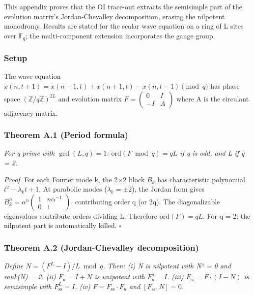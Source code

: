 \documentclass[
  11pt,
]{article}
\begin{document}
This appendix proves that the OI trace-out extracts the semisimple part
of the evolution matrix's Jordan-Chevalley decomposition, erasing the
nilpotent monodromy. Results are stated for the scalar wave equation on
a ring of L sites over \(\mathbb{F}_q\); the multi-component extension
incorporates the gauge group.

\hypertarget{setup}{%
\subsubsection{Setup}\label{setup}}

The wave equation
\(x(n, t+1) = x(n-1, t) + x(n+1, t) - x(n, t-1) \pmod{q}\) has phase
space \((\mathbb{Z}/q\mathbb{Z})^{2L}\) and evolution matrix
\(F = \left(\begin{smallmatrix} 0 & I \\ -I & A \end{smallmatrix}\right)\)
where A is the circulant adjacency matrix.

\hypertarget{theorem-a.1-period-formula}{%
\subsubsection{Theorem A.1 (Period
formula)}\label{theorem-a.1-period-formula}}

\emph{For q prime with \(\gcd(L, q) = 1\):
\(\mathrm{ord}(F \bmod q) = qL\) if q is odd, and L if q = 2.}

\emph{Proof.} For each Fourier mode k, the 2×2 block \(B_k\) has
characteristic polynomial \(t^2 - \lambda_k t + 1\). At parabolic modes
(\(\lambda_k = \pm 2\)), the Jordan form gives
\(B_k^n = \alpha^n \left(\begin{smallmatrix} 1 & n\alpha^{-1} \\ 0 & 1 \end{smallmatrix}\right)\),
contributing order q (or 2q). The diagonalizable eigenvalues contribute
orders dividing L. Therefore \(\mathrm{ord}(F) = qL\). For q = 2: the
nilpotent part is automatically killed. \(\square\)

\hypertarget{theorem-a.2-jordan-chevalley-decomposition}{%
\subsubsection{Theorem A.2 (Jordan-Chevalley
decomposition)}\label{theorem-a.2-jordan-chevalley-decomposition}}

\emph{Define \(N = (F^L - I)/L \bmod q\). Then: (i) N is nilpotent with
N² = 0 and rank(N) = 2. (ii) \(F_u = I + N\) is unipotent with
\(F_u^q = I\). (iii) \(F_{\mathrm{ss}} = F \cdot (I - N)\) is semisimple
with \(F_{\mathrm{ss}}^L = I\). (iv) \(F = F_{\mathrm{ss}} \cdot F_u\)
and \([F_{\mathrm{ss}}, N] = 0\).}
\end{document}
